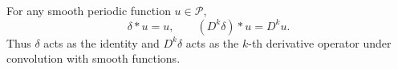 For any smooth periodic function $u \in \mathcal{P}$,
$$\delta * u = u, \qquad (D^k \delta) * u = D^k u.$$
Thus $\delta$ acts as the identity and $D^k \delta$ acts as the $k$-th derivative operator under convolution with smooth functions.
